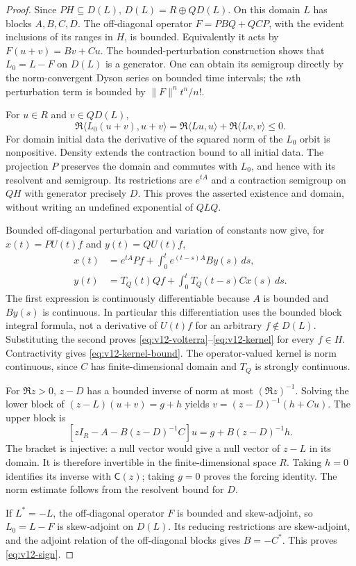 \begin{proof}
Since $P H\subseteq D(L)$, $D(L)=R\oplus QD(L)$. On this domain
$L$ has blocks $A,B,C,D$. The off-diagonal operator
$F=PBQ+QCP$, with the evident inclusions of its ranges in $H$, is
bounded. Equivalently it acts by $F(u+v)=Bv+Cu$.
The bounded-perturbation construction shows that
$L_0=L-F$ on $D(L)$ is a generator. One can obtain its semigroup directly
by the norm-convergent Dyson series on bounded time intervals; the
$n$th perturbation term is bounded by $\|F\|^n t^n/n!$.

For $u\in R$ and $v\in QD(L)$,
\[
 \Re\langle L_0(u+v),u+v\rangle
   =\Re\langle Lu,u\rangle+\Re\langle Lv,v\rangle\le0.
\]
For domain initial data the derivative of the squared norm of the
$L_0$ orbit is nonpositive. Density extends the contraction bound to all
initial data. The projection $P$ preserves the domain and commutes with
$L_0$, and hence with its resolvent and semigroup. Its restrictions are
$e^{tA}$ and a contraction semigroup on $QH$ with generator precisely
$D$. This proves the asserted existence and domain, without writing an
undefined exponential of $QLQ$.

Bounded off-diagonal perturbation and variation of constants now give,
for $x(t)=PU(t)f$ and $y(t)=QU(t)f$,
\begin{align*}
 x(t)&=e^{tA}Pf+\int_0^t e^{(t-s)A}By(s)\,ds,\\
 y(t)&=T_Q(t)Qf+\int_0^t T_Q(t-s)Cx(s)\,ds.
\end{align*}
The first expression is continuously differentiable because $A$ is
bounded and $By(s)$ is continuous. In particular this differentiation
uses the bounded block integral formula, not a derivative of $U(t)f$
for an arbitrary $f\notin D(L)$. Substituting the second proves
\eqref{eq:v12-volterra}--\eqref{eq:v12-kernel} for every $f\in H$.
Contractivity gives \eqref{eq:v12-kernel-bound}. The operator-valued
kernel is norm continuous, since $C$ has finite-dimensional domain and
$T_Q$ is strongly continuous.

For $\Re z>0$, $z-D$ has a bounded inverse of norm at most
$(\Re z)^{-1}$. Solving the lower block of $(z-L)(u+v)=g+h$ yields
$v=(z-D)^{-1}(h+Cu)$. The upper block is
\[
 [zI_R-A-B(z-D)^{-1}C]u=g+B(z-D)^{-1}h.
\]
The bracket is injective: a null vector would give a null vector of
$z-L$ in its domain. It is therefore invertible in the finite-dimensional
space $R$. Taking $h=0$ identifies its inverse with $\mathsf C(z)$;
taking $g=0$ proves the forcing identity. The norm estimate follows from
the resolvent bound for $D$.

If $L^*=-L$, the off-diagonal operator $F$ is bounded and skew-adjoint,
so $L_0=L-F$ is skew-adjoint on $D(L)$. Its reducing restrictions are
skew-adjoint, and the adjoint relation of the off-diagonal blocks gives
$B=-C^*$. This proves \eqref{eq:v12-sign}.
\end{proof}


